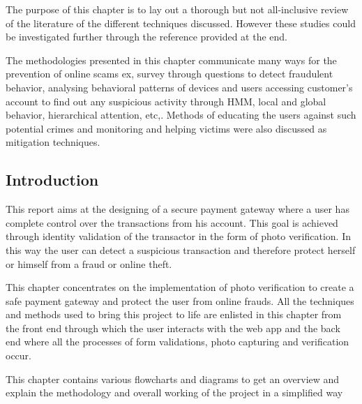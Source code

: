 \documentclass[12pt, oneside, a4paper]{article}
\begin{document}
The purpose of this chapter is to lay out a thorough but not all-inclusive review of the literature of the different techniques discussed. However these studies could be investigated further through the reference provided at the end. 

The methodologies presented in this chapter communicate many ways for the prevention of online scams ex, survey through questions to detect fraudulent behavior, analysing behavioral patterns of devices and users accessing customer's account to find out any suspicious activity through HMM, local and global behavior, hierarchical attention, etc,. Methods of educating the users against such potential crimes and monitoring and helping victims were also discussed as mitigation techniques. 


\pagebreak


\vspace{0.5cm}
\subsection{Introduction}
This report aims at the designing of a secure payment gateway where a user has complete control over the transactions from his account. This goal is achieved through identity validation of the transactor in the form of photo verification. In this way the user can detect a suspicious transaction and therefore protect herself or himself from a fraud or online theft.

This chapter concentrates on the implementation of photo verification to create a safe payment gateway and protect the user from online frauds. All the techniques and methods used to bring this project to life are enlisted in this chapter from the front end through which the user interacts with the web app and the back end where all the processes of form validations, photo capturing and verification occur.

This chapter contains various flowcharts and diagrams to get an overview and explain the methodology and overall working of the project in a simplified way
\end{document}

